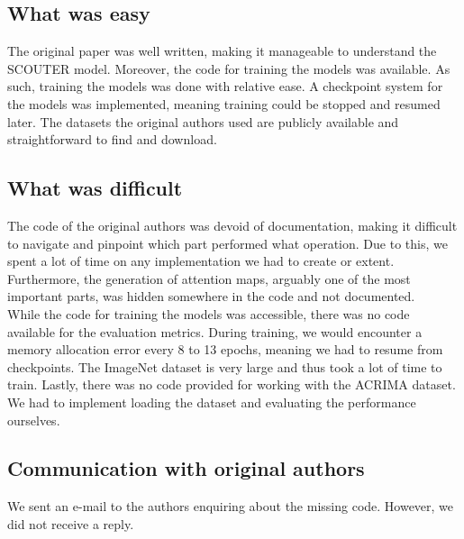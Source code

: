 \subsection{What was easy}
The original paper was well written, making it manageable to understand the SCOUTER model. Moreover, the code for training the models was available. As such, training the models was done with relative ease. A checkpoint system for the models was implemented, meaning training could be stopped and resumed later. The datasets the original authors used are publicly available and straightforward to find and download. 

\subsection{What was difficult}

The code of the original authors was devoid of documentation, making it difficult to navigate and pinpoint which part performed what operation. Due to this, we spent a lot of time on any implementation we had to create or extent. Furthermore, the generation of attention maps, arguably one of the most important parts, was hidden somewhere in the code and not documented.
\\
While the code for training the models was accessible, there was no code available for the evaluation metrics.
During training, we would encounter a memory allocation error every 8 to 13 epochs, meaning we had to resume from checkpoints. The ImageNet dataset is very large and thus took a lot of time to train.
Lastly, there was no code provided for working with the ACRIMA dataset. We had to implement loading the dataset and evaluating the performance ourselves.

\subsection{Communication with original authors}
We sent an e-mail to the authors enquiring about the missing code. However, we did not receive a reply.

%

